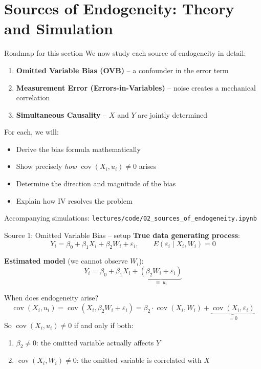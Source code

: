 \documentclass[10pt]{beamer}
\begin{document}
\section{Sources of Endogeneity: Theory and Simulation}

\begin{frame}{Roadmap for this section}
\label{slide:endogeneity_roadmap}
We now study each source of endogeneity in detail:
\begin{enumerate}
  \item \textbf{Omitted Variable Bias (OVB)} -- a confounder in the error term
  \item \textbf{Measurement Error (Errors-in-Variables)} -- noise creates a mechanical correlation
  \item \textbf{Simultaneous Causality} -- $X$ and $Y$ are jointly determined
\end{enumerate}

\vspace{0.5em}
For each, we will:
\begin{itemize}
  \item Derive the bias formula mathematically
  \item Show precisely \emph{how} $\operatorname{cov}(X_i, u_i) \neq 0$ arises
  \item Determine the direction and magnitude of the bias
  \item Explain how IV resolves the problem
\end{itemize}

\vspace{0.5em}
{\footnotesize\color{gray} Accompanying simulations: \texttt{lectures/code/02\_sources\_of\_endogeneity.ipynb}}
\end{frame}

\begin{frame}{Source 1: Omitted Variable Bias -- setup}
\label{slide:ovb_setup}
\textbf{True data generating process}:
\[
Y_i = \beta_0 + \beta_1 X_i + \beta_2 W_i + \varepsilon_i, \qquad E(\varepsilon_i \mid X_i, W_i) = 0
\]

\textbf{Estimated model} (we cannot observe $W_i$):
\[
Y_i = \beta_0 + \beta_1 X_i + \underbrace{(\beta_2 W_i + \varepsilon_i)}_{\equiv\; u_i}
\]

\pause
\begin{block}{When does endogeneity arise?}
\[
\operatorname{cov}(X_i, u_i) = \operatorname{cov}(X_i, \beta_2 W_i + \varepsilon_i) = \beta_2 \cdot \operatorname{cov}(X_i, W_i) + \underbrace{\operatorname{cov}(X_i, \varepsilon_i)}_{= 0}
\]
So $\operatorname{cov}(X_i, u_i) \neq 0$ if and only if \alert{both}:
\begin{enumerate}
  \item $\beta_2 \neq 0$: the omitted variable actually affects $Y$
  \item $\operatorname{cov}(X_i, W_i) \neq 0$: the omitted variable is correlated with $X$
\end{enumerate}
\end{block}
\end{frame}
\end{document}
